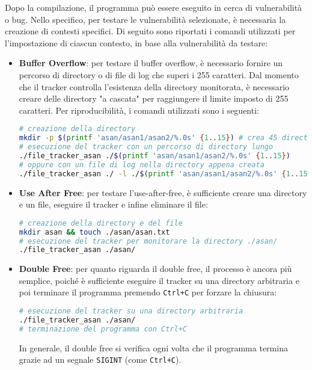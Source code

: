 Dopo la compilazione, il programma può essere eseguito in cerca di vulnerabilità
o bug. Nello specifico, per testare le vulnerabilità selezionate, è necessaria la
creazione di contesti specifici. Di seguito sono riportati i comandi utilizzati
per l'impostazione di ciascun contesto, in base alla vulnerabilità da testare:
\begin{itemize}
  \item \textbf{Buffer Overflow}: per testare il buffer overflow, è necessario
    fornire un percorso di directory o di file di log che superi i 255 caratteri.
    Dal momento che il tracker controlla l'esistenza della directory monitorata,
    è necessario creare delle directory "a cascata" per raggiungere il limite
    imposto di 255 caratteri. Per riproducibilità, i comandi utilizzati sono i
    seguenti: \begin{lstlisting}[language=bash, numbers=none]
# creazione della directory
mkdir -p $(printf 'asan/asan1/asan2/%.0s' {1..15}) # crea 45 directory annidate
# esecuzione del tracker con un percorso di directory lungo
./file_tracker_asan ./$(printf 'asan/asan1/asan2/%.0s' {1..15})
# oppure con un file di log nella directory appena creata
./file_tracker_asan ./ -l ./$(printf 'asan/asan1/asan2/%.0s' {1..15})logfile.log
    \end{lstlisting}

  \item \textbf{Use After Free}: per testare l'use-after-free, è sufficiente
    creare una directory e un file, eseguire il tracker e infine eliminare il file:
    \begin{lstlisting}[language=bash, numbers=none]
# creazione della directory e del file
mkdir asan && touch ./asan/asan.txt
# esecuzione del tracker per monitorare la directory ./asan/
./file_tracker_asan ./asan/
    \end{lstlisting}

  \item \textbf{Double Free}: per quanto riguarda il double free, il processo è
    ancora più semplice, poiché è sufficiente eseguire il tracker su una directory
    arbitraria e poi terminare il programma premendo \texttt{Ctrl+C} per forzare
    la chiusura: \begin{lstlisting}[language=bash, numbers=none]
# esecuzione del tracker su una directory arbitraria
./file_tracker_asan ./asan/
# terminazione del programma con Ctrl+C
\end{lstlisting}
    In generale, il double free si verifica ogni volta che il programma termina
    grazie ad un segnale \texttt{SIGINT} (come \texttt{Ctrl+C}).
\end{itemize}

